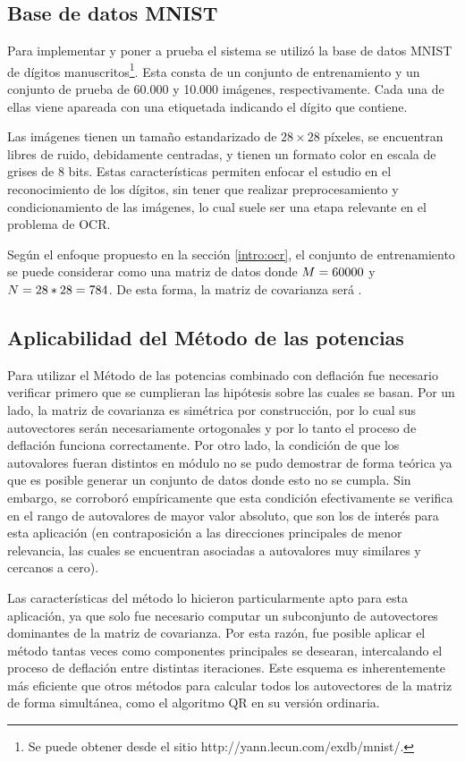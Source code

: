 \subsection{Base de datos MNIST}

Para implementar y poner a prueba el sistema se utilizó la base de datos MNIST de dígitos manuscritos\footnote{Se puede obtener desde el sitio http://yann.lecun.com/exdb/mnist/.}. Esta consta de un conjunto de entrenamiento y un conjunto de prueba de 60.000 y 10.000 imágenes, respectivamente. Cada una de ellas viene apareada con una etiquetada indicando el dígito que contiene.

Las imágenes tienen un tamaño estandarizado de $28 \times 28$ píxeles, se encuentran libres de ruido, debidamente centradas, y tienen un formato color en escala de grises de 8 bits. Estas características permiten enfocar el estudio en el reconocimiento de los dígitos, sin tener que realizar preprocesamiento y condicionamiento de las imágenes, lo cual suele ser una etapa relevante en el problema de OCR.

Según el enfoque propuesto en la sección \ref{intro:ocr}, el conjunto de entrenamiento se puede considerar como una matriz de datos \decMat{\X}{\M}{\N} donde $M = 60000$ y $N = 28 * 28 = 784$. De esta forma, la matriz de covarianza será .

\subsection{Aplicabilidad del Método de las potencias}

Para utilizar el Método de las potencias combinado con deflación fue necesario verificar primero que se cumplieran las hipótesis sobre las cuales se basan. Por un lado, la matriz de covarianza es simétrica por construcción, por lo cual sus autovectores serán necesariamente ortogonales y por lo tanto el proceso de deflación funciona correctamente. Por otro lado, la condición de que los autovalores fueran distintos en módulo no se pudo demostrar de forma teórica ya que es posible generar un conjunto de datos donde esto no se cumpla. Sin embargo, se corroboró empíricamente que esta condición efectivamente se verifica en el rango de autovalores de mayor valor absoluto, que son los de interés para esta aplicación (en contraposición a las direcciones principales de menor relevancia, las cuales se encuentran asociadas a autovalores muy similares y cercanos a cero).

Las características del método lo hicieron particularmente apto para esta aplicación, ya que solo fue necesario computar un subconjunto de autovectores dominantes de la matriz de covarianza. Por esta razón, fue posible aplicar el método tantas veces como componentes principales se desearan, intercalando el proceso de deflación entre distintas iteraciones. Este esquema es inherentemente más eficiente que otros métodos para calcular todos los autovectores de la matriz de forma simultánea, como el algoritmo QR en su versión ordinaria.

